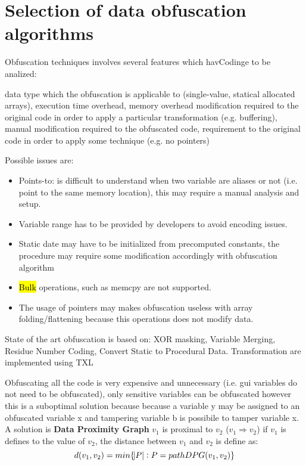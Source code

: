\section{Selection of data obfuscation algorithms}
	Obfuscation techniques involves several features which havCodinge to be analized:
	\begin{itemize}
		 data type which the obfuscation is applicable to (single-value, statical allocated arrays), 
		 execution time overhead, memory overhead
		 modification required to the original code in order to apply a particular transformation (e.g. buffering), manual modification required to the obfuscated code, requirement to the original code in order to apply some technique (e.g. no pointers)
	\end{itemize}
	Possible issues are:
	\begin{itemize}
		\item Points-to: is difficult to understand when two variable are aliases or not (i.e. point to the same memory location), this may require a manual analysis and setup. 
		\item Variable range has to be provided by developers to avoid encoding issues.
		\item Static date may have to be initialized from precomputed constants, the procedure may require some modification accordingly with obfuscation algorithm
		\item \hl{Bulk} operations, such as memcpy are not supported.
		\item The usage of pointers may makes obfuscation useless with array folding/flattening because this operations does not modify data.
	\end{itemize}
	State of the art obfuscation is based on: XOR masking, Variable Merging, Residue Number Coding, Convert Static to Procedural Data.
	Transformation are implemented using TXL 
	
	Obfuscating all the code is very expensive and unnecessary (i.e. gui variables do not need to be obfuscated), only sensitive variables can be obfuscated however this is a suboptimal solution because because a variable y may be assigned to an obfuscated variable x and tampering variable b is possibile to tamper variable x.
	A solution is \textbf{Data Proximity Graph} 
	$v_1$ is proximal to $v_2$ ($v_1 \Rightarrow v_2$) if $v_1$ is defines to the value of $v_2$, the distance between $v_1$ and $v_2$ is define as:
	\begin{equation}
		d(v_1, v_2) = min \{\abs{P} : P = pathDPG(v_1, v_2)\}
	\end{equation}
	

